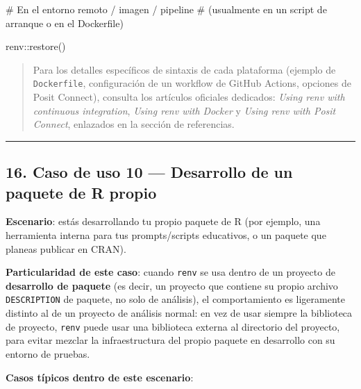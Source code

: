 \documentclass[
  man,
  floatsintext,
  longtable,
  a4paper,
  nolmodern,
  notxfonts,
  notimes,
  12pt,
  colorlinks=true,linkcolor=blue,citecolor=blue,urlcolor=blue]{apa7}
\newenvironment{Shaded}{\begin{snugshade}}{\end{snugshade}}
\newcommand{\CommentTok}[1]{\textcolor[rgb]{0.37,0.37,0.37}{#1}}
\newcommand{\FunctionTok}[1]{\textcolor[rgb]{0.28,0.35,0.67}{#1}}
\newcommand{\NormalTok}[1]{\textcolor[rgb]{0.00,0.23,0.31}{#1}}
\newcommand{\SpecialCharTok}[1]{\textcolor[rgb]{0.37,0.37,0.37}{#1}}
\begin{document}
\begin{Shaded}
\begin{Highlighting}[]
\CommentTok{\# En el entorno remoto / imagen / pipeline}
\CommentTok{\# (usualmente en un script de arranque o en el Dockerfile)}
\end{Highlighting}
\end{Shaded}

\begin{Shaded}
\begin{Highlighting}[]
\NormalTok{renv}\SpecialCharTok{::}\FunctionTok{restore}\NormalTok{()}
\end{Highlighting}
\end{Shaded}

\begin{quote}
Para los detalles específicos de sintaxis de cada plataforma (ejemplo de
\texttt{Dockerfile}, configuración de un workflow de GitHub Actions,
opciones de Posit Connect), consulta los artículos oficiales dedicados:
\emph{Using renv with continuous integration}, \emph{Using renv with
Docker} y \emph{Using renv with Posit Connect}, enlazados en la sección
de referencias.
\end{quote}

\begin{center}\rule{0.5\linewidth}{0.5pt}\end{center}

\subsection{16. Caso de uso 10 --- Desarrollo de un paquete de R
propio}\label{caso-de-uso-10-desarrollo-de-un-paquete-de-r-propio}

\textbf{Escenario}: estás desarrollando tu propio paquete de R (por
ejemplo, una herramienta interna para tus prompts/scripts educativos, o
un paquete que planeas publicar en CRAN).

\textbf{Particularidad de este caso}: cuando \texttt{renv} se usa dentro
de un proyecto de \textbf{desarrollo de paquete} (es decir, un proyecto
que contiene su propio archivo \texttt{DESCRIPTION} de paquete, no solo
de análisis), el comportamiento es ligeramente distinto al de un
proyecto de análisis normal: en vez de usar siempre la biblioteca de
proyecto, \texttt{renv} puede usar una biblioteca externa al directorio
del proyecto, para evitar mezclar la infraestructura del propio paquete
en desarrollo con su entorno de pruebas.

\textbf{Casos típicos dentro de este escenario}:
\end{document}
